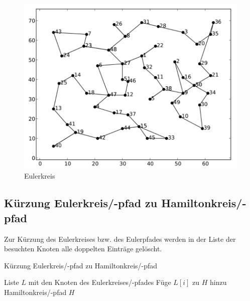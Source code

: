 \documentclass[11pt,a4paper]{article}
\begin{document}
\begin{figure}[H]
        \centering
        \includegraphics[width=11.5cm]{gfx/eil51_euler}
        \caption{Eulerkreis}
        \label{img:eil51_euler}
\end{figure}

\newpage

\subsection{Kürzung Eulerkreis/-pfad zu Hamiltonkreis/-pfad}
Zur Kürzung des Eulerkreises bzw. des Eulerpfades werden in der Liste der besuchten Knoten alle doppelten Einträge gelöscht.

\begin{algorithm}[H]
    \renewcommand{\algorithmicrequire}{\textbf{Eingabe:}}
    \renewcommand{\algorithmicensure}{\textbf{Ausgabe:}}
    \caption{Kürzung Eulerkreis/-pfad zu Hamiltonkreis/-pfad}

    \begin{algorithmic}[1]
    \REQUIRE Liste $L$ mit den Knoten des Eulerkreises/-pfades 
            \STATE Füge $L[i]$ zu $H$ hinzu
        \ENDIF
    \ENDFOR
    \ENSURE Hamiltonkreis/-pfad $H$
    \end{algorithmic}
\end{algorithm}
\end{document}
